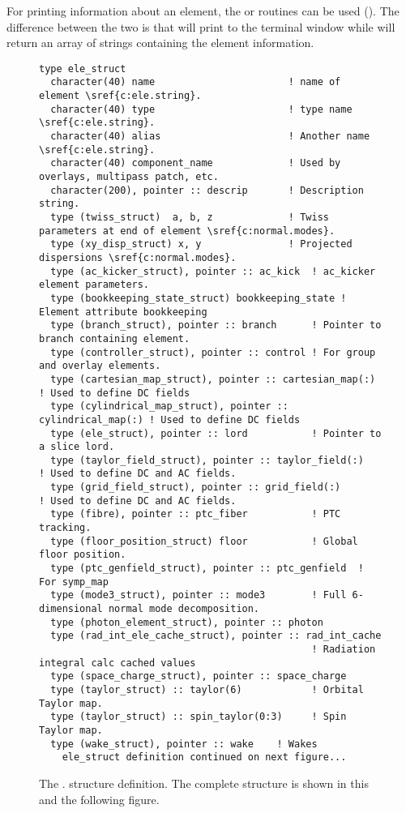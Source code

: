 For printing information about an element, the
 or  routines
can be used (). The difference between the two is
that  will print to the terminal window while 
will return an array of strings containing the element information.
\nopagebreak[4]
\begin{figure}[htb]
\centering
\footnotesize
\begin{verbatim}
type ele_struct
  character(40) name                       ! name of element \sref{c:ele.string}.
  character(40) type                       ! type name \sref{c:ele.string}.
  character(40) alias                      ! Another name \sref{c:ele.string}.
  character(40) component_name             ! Used by overlays, multipass patch, etc.
  character(200), pointer :: descrip       ! Description string.
  type (twiss_struct)  a, b, z             ! Twiss parameters at end of element \sref{c:normal.modes}.
  type (xy_disp_struct) x, y               ! Projected dispersions \sref{c:normal.modes}.
  type (ac_kicker_struct), pointer :: ac_kick  ! ac_kicker element parameters.
  type (bookkeeping_state_struct) bookkeeping_state ! Element attribute bookkeeping
  type (branch_struct), pointer :: branch      ! Pointer to branch containing element.
  type (controller_struct), pointer :: control ! For group and overlay elements. 
  type (cartesian_map_struct), pointer :: cartesian_map(:)     ! Used to define DC fields
  type (cylindrical_map_struct), pointer :: cylindrical_map(:) ! Used to define DC fields
  type (ele_struct), pointer :: lord           ! Pointer to a slice lord.
  type (taylor_field_struct), pointer :: taylor_field(:)       ! Used to define DC and AC fields.
  type (grid_field_struct), pointer :: grid_field(:)           ! Used to define DC and AC fields.
  type (fibre), pointer :: ptc_fiber           ! PTC tracking.
  type (floor_position_struct) floor           ! Global floor position.
  type (ptc_genfield_struct), pointer :: ptc_genfield  ! For symp_map
  type (mode3_struct), pointer :: mode3        ! Full 6-dimensional normal mode decomposition.
  type (photon_element_struct), pointer :: photon
  type (rad_int_ele_cache_struct), pointer :: rad_int_cache  
                                               ! Radiation integral calc cached values 
  type (space_charge_struct), pointer :: space_charge 
  type (taylor_struct) :: taylor(6)            ! Orbital Taylor map.
  type (taylor_struct) :: spin_taylor(0:3)     ! Spin Taylor map.
  type (wake_struct), pointer :: wake    ! Wakes
    ele_struct definition continued on next figure...
\end{verbatim}
\caption[The  (part 1).]{The . structure definition. 
The complete structure is shown in this and the following figure.}
\label{f:ele.struct1}
\end{figure}

